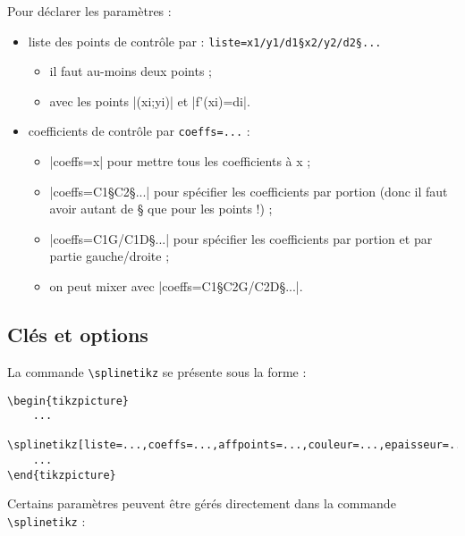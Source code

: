 \documentclass{article}
\begin{document}
\medskip

Pour déclarer les paramètres :
%
\begin{itemize}
	\item liste des points de contrôle par : \verb|liste=x1/y1/d1§x2/y2/d2§...|
	\begin{itemize}
		\item il faut au-moins deux points ;
		\item avec les points \pverb|(xi;yi)| et \vverb|f'(xi)=di|.
	\end{itemize}
	\item coefficients de contrôle par \verb|coeffs=...| :
	\begin{itemize}
		\item \averb|coeffs=x| pour mettre tous les coefficients à x ;
		\item \averb|coeffs=C1§C2§...| pour spécifier les coefficients par portion (donc il faut avoir autant de § que pour les points !) ;
		\item \averb|coeffs=C1G/C1D§...| pour spécifier les coefficients par portion et par partie gauche/droite ;
		\item on peut mixer avec \averb|coeffs=C1§C2G/C2D§...|.
	\end{itemize}
\end{itemize}

\subsection{Clés et options}

La commande \verb|\splinetikz| se présente sous la forme :

\begin{verbatim}
\begin{tikzpicture}
	...
	\splinetikz[liste=...,coeffs=...,affpoints=...,couleur=...,epaisseur=...,taillepoints=...,couleurpoints=...,style=...]
	...
\end{tikzpicture}
\end{verbatim}

Certains paramètres peuvent être gérés directement dans la commande \verb|\splinetikz| :
\end{document}
